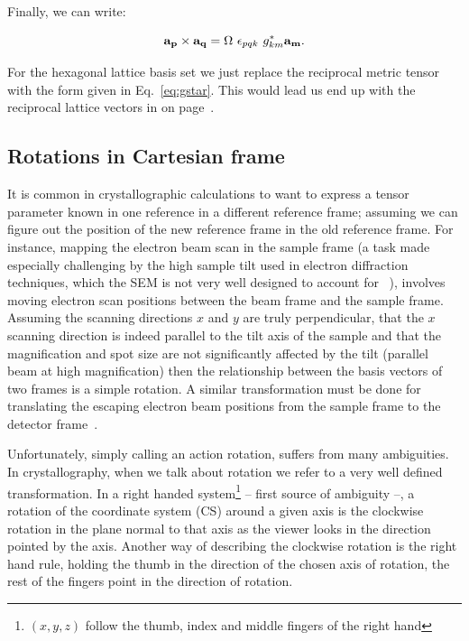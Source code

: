 Finally, we can write: 

\begin{equation*}
\vb{a_p} \times \vb{a_q} = \Omega \,\, \epsilon_{pqk}\, \,  g^*_{km} \vb{a_m}.
\end{equation*}

For the hexagonal lattice basis set we just replace the reciprocal metric tensor with the form given in Eq.~\ref{eq:gstar}. This would lead us end up with the reciprocal lattice vectors in on page~\pageref{eq:3recvectors}.

\subsection{Rotations in Cartesian frame}
\label{subchap:basicRot}
It is common in crystallographic calculations to want to express a tensor parameter known in one reference in a different reference frame; assuming we can figure out the position of the new reference frame in the old reference frame. For instance, mapping the electron beam scan in the sample frame (a task made especially challenging by the high sample tilt used in electron diffraction techniques, which the SEM is not very well designed to account for ~\cite{Nolze07}), involves moving electron scan positions between the beam frame and the sample frame. Assuming the scanning directions $x$ and $y$ are truly perpendicular, that the $x$ scanning direction is indeed parallel to the tilt axis of the sample and that the magnification and spot size are not significantly affected by the tilt (\ie parallel beam at high magnification) then the relationship between the basis vectors of two frames is a simple rotation. A similar transformation must be done for translating the escaping electron beam positions from the sample frame to the detector frame~\cite{Britton16}. 

Unfortunately, simply calling an action rotation, suffers from many ambiguities. In crystallography, when we talk about rotation we refer to a very well defined transformation. In a right handed system\footnote{ $(x, y, z)$ follow the thumb, index and middle fingers of the right hand} -- first source of ambiguity --, a rotation of the coordinate system (CS) around a given axis is the clockwise rotation in the plane normal to that axis as the viewer looks in the direction pointed by the axis. Another way of describing the clockwise rotation is the right hand rule, \ie holding the thumb in the direction of the chosen axis of rotation, the rest of the fingers point in the direction of rotation. 

